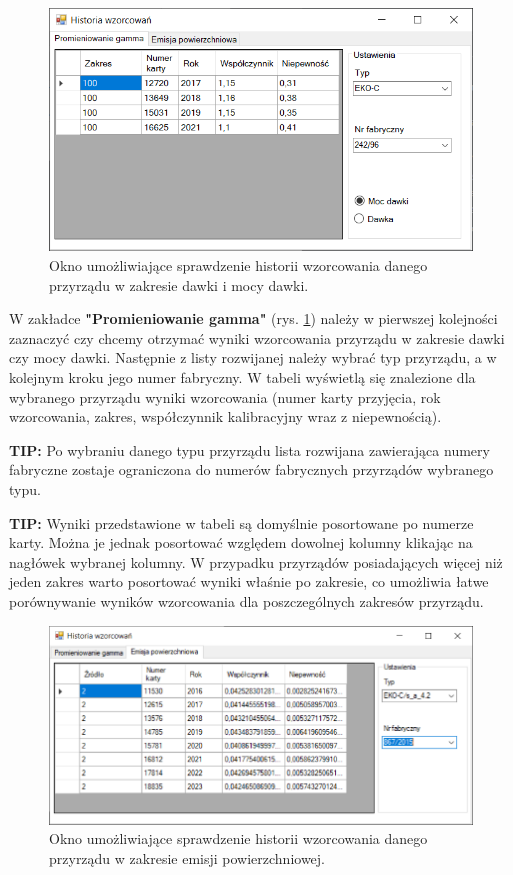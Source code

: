 \begin{figure}[H]
	\centering
	\includegraphics{obrazki/Wyszukiwanie/historia_wzorcowan_moc.png}
	\caption{Okno umożliwiające sprawdzenie historii wzorcowania danego przyrządu w zakresie dawki i mocy dawki.}
	\label{historiaWzorcowanMoc}
\end{figure}

W zakładce \textbf{"Promieniowanie gamma"} (rys. \ref{historiaWzorcowanMoc}) należy w pierwszej kolejności zaznaczyć czy chcemy otrzymać wyniki wzorcowania przyrządu w zakresie dawki czy mocy dawki. Następnie z listy rozwijanej należy wybrać typ przyrządu, a w kolejnym kroku jego numer fabryczny. W tabeli wyświetlą się znalezione dla wybranego przyrządu wyniki wzorcowania (numer karty przyjęcia, rok wzorcowania, zakres, współczynnik kalibracyjny wraz z niepewnością).

\textbf{TIP:} Po wybraniu danego typu przyrządu lista rozwijana zawierająca numery fabryczne zostaje ograniczona do numerów fabrycznych przyrządów wybranego typu.

\textbf{TIP:} Wyniki przedstawione w tabeli są domyślnie posortowane po numerze karty. Można je jednak posortować względem dowolnej kolumny klikając na nagłówek wybranej kolumny. W przypadku przyrządów posiadających więcej niż jeden zakres warto posortować wyniki właśnie po zakresie, co umożliwia łatwe porównywanie wyników wzorcowania dla poszczególnych zakresów przyrządu.

\begin{figure}[htb]
	\centering
	\includegraphics{obrazki/Wyszukiwanie/historia_wzorcowan_skazenia.png}
	\caption{Okno umożliwiające sprawdzenie historii wzorcowania danego przyrządu w zakresie emisji powierzchniowej.}
	\label{historiaWzorcowanSkazenia}
\end{figure}

